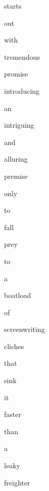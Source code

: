 \documentclass[varwidth]{standalone}
\begin{document}
\begin{CJK*}{UTF8}{gbsn}
{\setlength{\fboxsep}{0pt}\colorbox{white!0}{\parbox{0.8\textwidth}{
\colorbox{red!12.894462}{\strut starts} \colorbox{red!12.917763}{\strut out} \colorbox{red!5.3102994}{\strut with} \colorbox{red!63.996666}{\strut tremendous} \colorbox{red!48.31113}{\strut promise} \colorbox{red!13.504386}{\strut introducing} \colorbox{blue!5.0589848}{\strut an} \colorbox{red!38.367382}{\strut intriguing} \colorbox{red!4.3122873}{\strut and} \colorbox{red!17.149902}{\strut alluring} \colorbox{blue!4.594395}{\strut premise} \colorbox{red!12.398098}{\strut only} \colorbox{red!7.877758}{\strut to} \colorbox{red!1.695578}{\strut fall} \colorbox{red!0.24889877}{\strut prey} \colorbox{red!3.2718382}{\strut to} \colorbox{red!2.8787727}{\strut a} \colorbox{blue!1.1627978}{\strut boatload} \colorbox{blue!0.22193834}{\strut of} \colorbox{blue!4.673734}{\strut screenwriting} \colorbox{red!2.4392288}{\strut cliches} \colorbox{red!9.992298}{\strut that} \colorbox{red!6.3446865}{\strut sink} \colorbox{blue!0.5801939}{\strut it} \colorbox{red!8.74855}{\strut faster} \colorbox{red!7.717117}{\strut than} \colorbox{red!6.4836526}{\strut a} \colorbox{blue!1.5193763}{\strut leaky} \colorbox{red!1.1205802}{\strut freighter} 
}}}
\end{CJK*}
\end{document}
